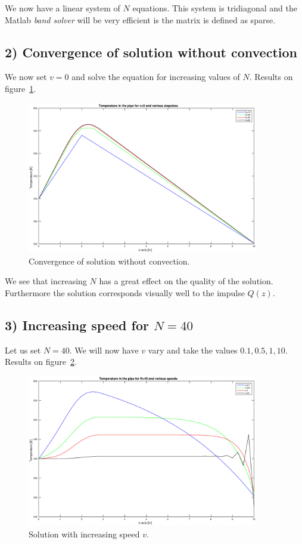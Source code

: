 \documentclass[11pt,a4paper]{report}
\begin{document}
We now have a linear system of $N$ equations.  This system is tridiagonal and the Matlab \textit{band solver} will be very efficient is the matrix is defined as sparse.

\subsection*{2) Convergence of solution without convection}

We now set $v=0$ and solve the equation for increasing values of $N$. Results on figure~\ref{fig:1}.

\begin{figure}[!h]
\centering
\includegraphics[width = 0.9\textwidth]{./fig1.eps}
\caption{Convergence of solution without convection.}
\label{fig:1}
\end{figure}

We see that increasing $N$ has a great effect on the quality of the solution. Furthermore the solution corresponds visually well to the impulse $Q(z)$.

\subsection*{3) Increasing speed for $N=40$}

Let us set $N=40$. We will now have $v$ vary and take the values $0.1, 0.5, 1,10$. Results on figure~\ref{fig:2}.

\begin{figure}[!h]
\centering
\includegraphics[width = 0.9\textwidth]{./fig2.eps}
\caption{Solution with increasing speed $v$.}
\label{fig:2}
\end{figure}
\end{document}
